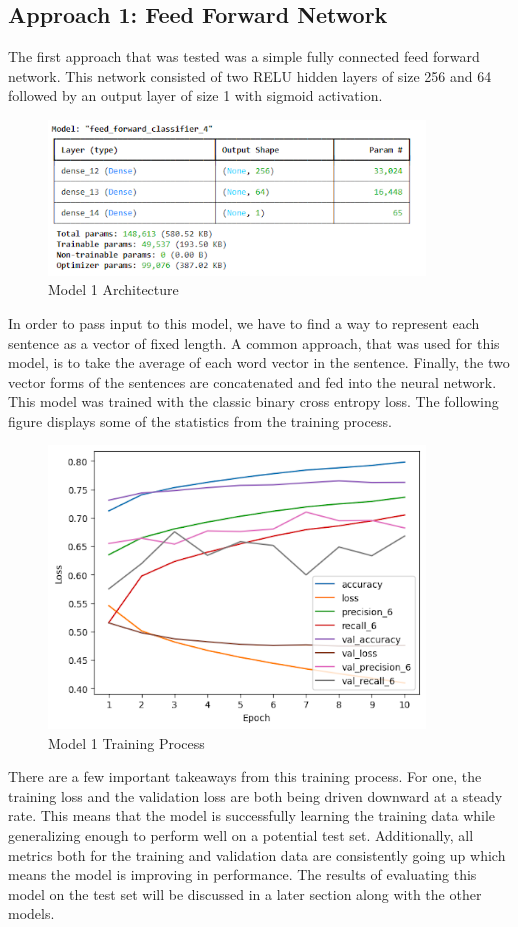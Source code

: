\documentclass{article}
\begin{document}
\subsection{Approach 1: Feed Forward Network}
The first approach that was tested was a simple fully connected feed forward network. This network consisted of two RELU hidden layers of size 256 and 64 followed by an output layer of size 1 with sigmoid activation.
\begin{figure}[htp]
    \centering
    \includegraphics[width=10cm]{model1.png}
    \caption{Model 1 Architecture}
\end{figure}
In order to pass input to this model, we have to find a way to represent each sentence as a vector of fixed length. A common approach, that was used for this model, is to take the average of each word vector in the sentence. Finally, the two vector forms of the sentences are concatenated and fed into the neural network. This model was trained with the classic binary cross entropy loss. The following figure displays some of the statistics from the training process.
\begin{figure}[htp]
    \centering
    \includegraphics[width=10cm]{model1_train.png}
    \caption{Model 1 Training Process}
\end{figure}
There are a few important takeaways from this training process. For one, the training loss and the validation loss are both being driven downward at a steady rate. This means that the model is successfully learning the training data while generalizing enough to perform well on a potential test set. Additionally, all metrics both for the training and validation data are consistently going up which means the model is improving in performance. The results of evaluating this model on the test set will be discussed in a later section along with the other models.
\end{document}
